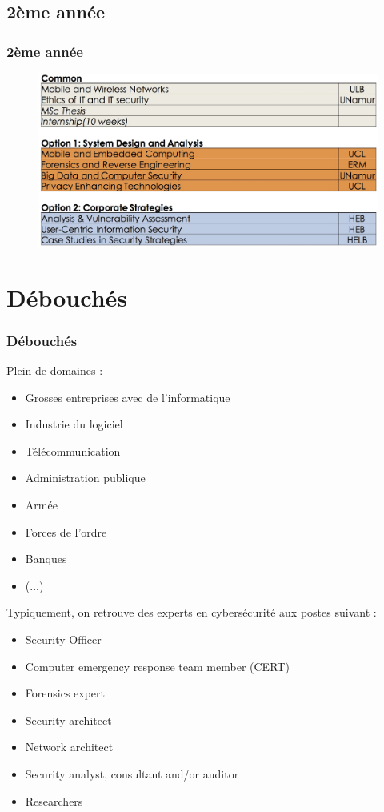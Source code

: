 \documentclass{beamer}
\begin{document}
\subsection{2ème année}
\begin{frame}[c]
  \frametitle{2ème année}
  \begin{figure}
    \includegraphics[width=\textwidth]{imgs/cursus2.jpg}
  \end{figure}
\end{frame}

\section{Débouchés}
\begin{frame}[c]
  \frametitle{Débouchés}
    \par Plein de domaines :
    \begin{itemize}
        \item Grosses entreprises avec de l'informatique
        \item Industrie du logiciel
        \item Télécommunication
        \item Administration publique
        \item Armée
        \item Forces de l'ordre
        \item Banques
        \item (...)
    \end{itemize}
\end{frame}

\begin{frame}[c]
    \par Typiquement, on retrouve des experts en cybersécurité aux postes suivant :
    \begin{itemize}
        \item Security Officer
        \item Computer emergency response team member (CERT)
        \item Forensics expert
        \item Security architect
        \item Network architect
        \item Security analyst, consultant and/or auditor
        \item Researchers
    \end{itemize}
\end{frame}
\end{document}

